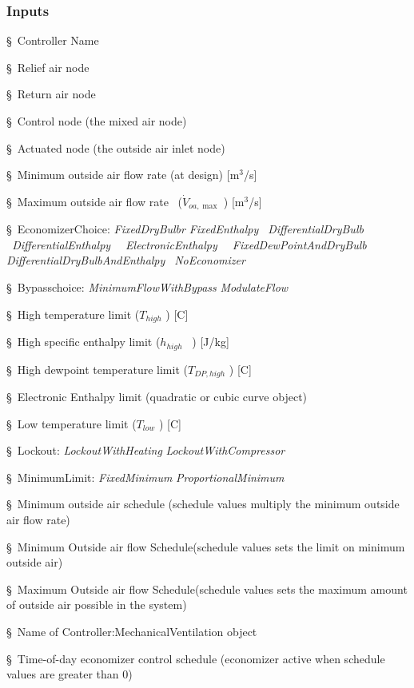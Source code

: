 \subsubsection{Inputs}\label{inputs}

§~Controller Name

§~Relief air node

§~Return air node

§~Control node (the mixed air node)

§~Actuated node (the outside air inlet node)

§~Minimum outside air flow rate (at design) {[}m\(^{3}\)/s{]}

§~Maximum outside air flow rate~ (\({\dot V_{oa,\max }}\) ) {[}m\(^{3}\)/s{]}

§~EconomizerChoice: \emph{FixedDryBulbr} \textbar{} \emph{FixedEnthalpy} \textbar{} \emph{~DifferentialDryBulb~} \textbar{} \emph{~DifferentialEnthalpy} \textbar{} \emph{~~ElectronicEnthalpy} \textbar{} \emph{~~FixedDewPointAndDryBulb~~~} \textbar{} \emph{DifferentialDryBulbAndEnthalpy~} \textbar{} \emph{NoEconomizer}

§~Bypasschoice: \emph{MinimumFlowWithBypass} \textbar{} \emph{ModulateFlow}

§~High temperature limit (\({T_{high}}\) ) {[}C{]}

§~High specific enthalpy limit (\({h_{high}}\) ~) {[}J/kg{]}

§~High dewpoint temperature limit (\({T_{DP,high}}\) ) {[}C{]}

§~Electronic Enthalpy limit (quadratic or cubic curve object)

§~Low temperature limit (\({T_{low}}\) ) {[}C{]}

§~Lockout: \emph{LockoutWithHeating} \textbar{} \emph{LockoutWithCompressor}

§~MinimumLimit: \emph{FixedMinimum} \textbar{} \emph{ProportionalMinimum}

§~Minimum outside air schedule (schedule values multiply the minimum outside air flow rate)

§~Minimum Outside air flow Schedule(schedule values sets the limit on minimum outside air)

§~Maximum Outside air flow Schedule(schedule values sets the maximum amount of outside air possible in the system)

§~Name of Controller:MechanicalVentilation object

§~Time-of-day economizer control schedule (economizer active when schedule values are greater than 0)

